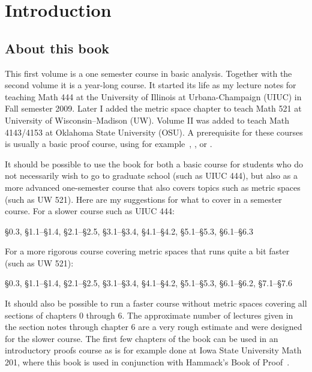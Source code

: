 \chapter*{Introduction}


\section{About this book}

This first volume is a one semester course in basic analysis.
Together with the second volume it is a year-long course.
It started its life
as my lecture notes for teaching Math 444 at the
University of Illinois at Urbana-Champaign (UIUC) in Fall semester 2009.
Later I added the metric space chapter to teach Math 521 at University of
Wisconsin--Madison (UW)\@.
Volume II was added to teach Math 4143/4153 at Oklahoma State University
(OSU)\@.
A prerequisite for these courses is usually a basic proof course,
using 
for example~\cite{Hammack}, \cite{GIAM}, or \cite{DW}.

It should be possible to use the book for
both a basic course for students who do not necessarily wish to
go to graduate school (such as UIUC 444), but also as a more advanced one-semester
course that also covers topics such as metric spaces (such as UW 521).
Here are my suggestions for what to cover in a semester course.  For a
slower course such as UIUC 444:
\begin{center}
\S0.3, \S1.1--\S1.4, \S2.1--\S2.5, \S3.1--\S3.4, \S4.1--\S4.2,
\S5.1--\S5.3, \S6.1--\S6.3
\end{center}
For a more rigorous course covering metric spaces that runs quite a bit faster
(such as UW 521):
\begin{center}
\S0.3, \S1.1--\S1.4, \S2.1--\S2.5, \S3.1--\S3.4, \S4.1--\S4.2,
\S5.1--\S5.3, \S6.1--\S6.2, \S7.1--\S7.6
\end{center}
It should also be possible to run a faster course without metric spaces
covering all sections of chapters 0 through 6.  The approximate number of
lectures given in the section notes through chapter 6 are a very rough
estimate and were designed for the slower course.
The first few chapters of the book can be used in an introductory proofs
course as is for example done at Iowa State University Math 201, where 
this book is used in conjunction with Hammack's Book of Proof~\cite{Hammack}.

